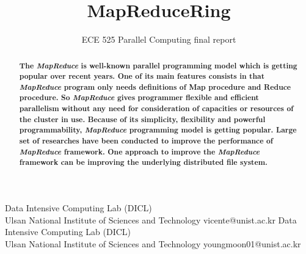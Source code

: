 \documentclass[nocopyrightspace]{sigplanconf}
\begin{document}
\setlength{\pdfpageheight}{\paperheight}
\setlength{\pdfpagewidth}{\paperwidth}






\title{MapReduceRing}
\subtitle{ECE 525 Parallel Computing final report}

           {Data Intensive Computing Lab (DICL)\\
           Ulsan National Institute of Sciences and Technology}
           {vicente@unist.ac.kr}
           {Data Intensive Computing Lab (DICL)\\
           Ulsan National Institute of Sciences and Technology}
           {youngmoon01@unist.ac.kr}

\maketitle

\begin{abstract}
\textbf{
The \textit{MapReduce} is well-known parallel programming model which is getting popular over recent years.
One of its main features consists in that \textit{MapReduce} program only needs definitions of Map procedure and Reduce procedure.
So \textit{MapReduce} gives programmer flexible and efficient parallelism without any need for consideration of 
capacities or resources of the cluster in use.
Because of its simplicity, flexibility and powerful programmability, \textit{MapReduce} programming model is 
getting popular. Large set of researches have been conducted to improve the performance of \textit{MapReduce} framework.
One approach to improve the \textit{MapReduce} framework can be improving the underlying distributed file system. 
}
\end{abstract}
\end{document}
